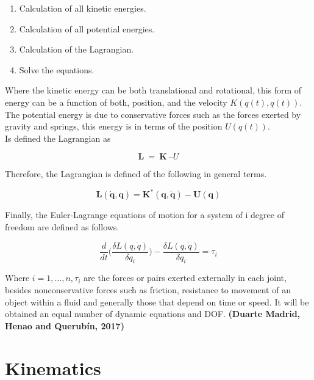 \documentclass{UoNMCHA}
\numberwithin{equation}{section}
\begin{document}
	\begin{enumerate}
		\item Calculation of all kinetic energies.
		\item Calculation of all potential energies.
		\item Calculation of the Lagrangian.
		\item Solve the equations.
		
	\end{enumerate}
	
	Where the kinetic energy can be both translational and rotational, this form of energy can be a function of both, position, and the velocity $K(q(t), q(t))$. \\
	The potential energy is due to conservative forces such as the forces exerted by gravity and springs, this energy is in terms of the position $U(q(t))$. \\
	Is defined the Lagrangian as
	
	\begin{equation}
	\mathbf{L}\ =\ \mathbf{K}\ – U
	\end{equation}
	
	Therefore, the Lagrangian is defined of the following in general terms.
	
	\begin{equation}
	\mathbf{L}\left(\dot{\mathbf{q}},\mathbf{q}\right)=\mathbf{K}^\ast\left(\mathbf{q},\dot{\mathbf{q}}\right)-\mathbf{U}\left(\mathbf{q}\right)
	\end{equation}
	
	Finally, the Euler-Lagrange equations of motion for a system of i degree of freedom are defined as follows.
	
	\begin{equation}
	\frac{d}{dt}\big(  \frac{\delta L(q,\dot{q})}{\delta q_{i}} \big) -\frac{\delta L(q,\dot{q})}{\delta q_i}=\tau_i
	\end{equation}
	
	
	Where $i=1,\ldots,n,\tau_i$ are the forces or pairs exerted externally in each joint, besides nonconservative forces such as friction, resistance to movement of an object within a fluid and generally those that depend on time or speed. It will be obtained an equal number of dynamic equations and DOF. \textbf{(Duarte Madrid, Henao and Querubín, 2017)}
	
	\section{Kinematics}
	
\end{document}
